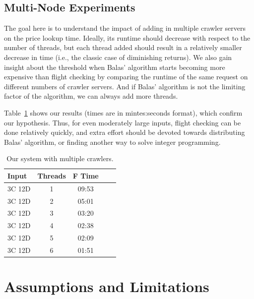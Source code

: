 \documentclass{article}
\begin{document}
\subsection{Multi-Node Experiments}\label{sec:distributed_experiment}

The goal here is to understand the impact of adding in multiple crawler servers on the price lookup time. Ideally, its runtime should decrease with
respect to the number of threads, but each thread added should result in a relatively smaller decrease in time (i.e., the classic case of diminishing
returns). We also gain insight about the threshold when Balas' algorithm starts becoming more expensive than flight checking by comparing the runtime
of the same request on different numbers of crawler servers. And if Balas' algorithm is not the limiting factor of the algorithm, we can always add
more threads.

Table~\ref{tab:multiple-node} shows our results (times are in mintes:seconds format), which confirm our hypothesis.  Thus, for even moderately large
inputs, flight checking can be done relatively quickly, and extra effort should be devoted towards distributing Balas' algorithm, or finding another
way to solve integer programming.

\begin{table}[t]
\caption{Our system with multiple crawlers.}
\label{tab:multiple-node}
\vskip 0.15in
\begin{center}
\begin{small}
\begin{sc}
\begin{tabular}{lcccc}
\hline
\abovespace\belowspace
Input & Threads & F Time \\
\hline
\abovespace
3C 12D & 1 & 09:53 \\
3C 12D & 2 & 05:01 \\
3C 12D & 3 & 03:20 \\
3C 12D & 4 & 02:38 \\
3C 12D & 5 & 02:09 \\
\belowspace
3C 12D & 6 & 01:51 \\
\hline
\end{tabular}
\end{sc}
\end{small}
\end{center}
\vskip -0.1in
\end{table}



\section{Assumptions and Limitations}\label{sec:limitations}
\end{document}
